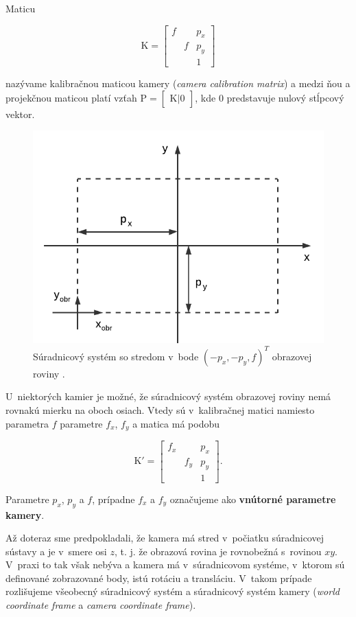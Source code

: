 Maticu

$$ \mathrm{K} 
=
\begin{bmatrix}
f &   &  p_x \\
  & f &  p_y \\
  &   &   1  
\end{bmatrix}
$$

nazývame kalibračnou maticou kamery (\emph{camera calibration matrix}) a medzi ňou a projekčnou maticou platí vzťah
$\mathrm{P} = \begin{bmatrix} \mathrm{K} | 0 \end{bmatrix}$, kde $0$ predstavuje nulový stĺpcový vektor.

\begin{figure}[h!]
    \centering
    \includegraphics[width=0.7\linewidth]{text_prace/obrazky-figures/model_kamery3.pdf}
    \caption[Súradnicový systém so stredom v~bode $(-p_x, -p_y, f)^T$ obrazovej roviny.]{Súradnicový systém so stredom v~bode $(-p_x, -p_y, f)^T$ obrazovej roviny \cite{multiple_view_geometry}.}
    \label{fig:model_kamery3}
\end{figure}

U~niektorých kamier je možné, že súradnicový systém obrazovej roviny nemá rovnakú mierku na oboch osiach. Vtedy sú v~kalibračnej matici namiesto parametra $f$ parametre $f_x$, $f_y$ a matica má podobu

$$ \mathrm{K'} 
=
\begin{bmatrix}
f_x &     &  p_x \\
    & f_y &  p_y \\
    &     &   1  
\end{bmatrix} \mathrm{.}
$$

Parametre $p_x$, $p_y$ a $f$, prípadne $f_x$ a $f_y$ označujeme ako \textbf{vnútorné parametre kamery}.

Až doteraz sme predpokladali, že kamera má stred v~počiatku súradnicovej sústavy a je  v~smere osi $z$, t. j. že obrazová rovina je rovnobežná s~rovinou $xy$. V~praxi to tak však nebýva a kamera má v~súradnicovom systéme, v~ktorom sú definované zobrazované body, istú rotáciu a transláciu. V~takom prípade rozlišujeme všeobecný súradnicový systém a súradnicový systém kamery (\emph{world coordinate frame} a \emph{camera coordinate frame}).

